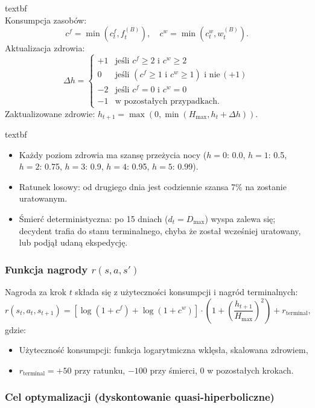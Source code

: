\noindent\csname textbf
\\Konsumpcja zasobów:
\[
c^f = \min(c^f_t, f_t^{(B)}), \quad c^w = \min(c^w_t, w_t^{(B)}).
\]
Aktualizacja zdrowia:
\[
\Delta h = \begin{cases}
+1 & \text{jeśli } c^f \ge 2 \text{ i } c^w \ge 2 \\
0 & \text{jeśli } (c^f \ge 1 \text{ i } c^w \ge 1) \text{ i nie}\, (+1) \\
-2 & \text{jeśli } c^f = 0 \text{ i } c^w = 0 \\
-1 & \text{w pozostałych przypadkach}.
\end{cases}
\]
Zaktualizowane zdrowie: $h_{t+1} = \max(0, \min(H_{\max}, h_t + \Delta h))$.

\noindent\csname textbf 
\begin{itemize}
    \item Każdy poziom zdrowia ma szansę przeżycia nocy ($h=0$: 0.0, $h=1$: 0.5, $h=2$: 0.75, $h=3$: 0.9, $h=4$: 0.95, $h=5$: 0.99).
    \item Ratunek losowy: od drugiego dnia jest codziennie szansa 7\% na zostanie uratowanym.
    \item Śmierć deterministyczna: po 15 dniach ($d_t = D_{\max}$) wyspa zalewa się; decydent trafia do stanu terminalnego, chyba że został wcześniej uratowany, lub podjął udaną ekspedycję.
\end{itemize}

\subsubsection{Funkcja nagrody $r(s,a,s')$}

Nagroda za krok $t$ składa się z użyteczności konsumpcji i nagród terminalnych:
\[
r(s_t,a_t,s_{t+1}) = \left[\log(1 + c^f) + \log(1 + c^w)\right] \cdot \left(1 + \left(\frac{h_{t+1}}{H_{\max}}\right)^2\right) + r_{\mathrm{terminal}},
\]
gdzie:
\begin{itemize}
    \item Użyteczność konsumpcji: funkcja logarytmiczna wklęsła, skalowana zdrowiem,
    \item $r_{\mathrm{terminal}} = +50$ przy ratunku, $-100$ przy śmierci, $0$ w pozostałych krokach.
\end{itemize}

\subsubsection{Cel optymalizacji (dyskontowanie quasi-hiperboliczne)}

